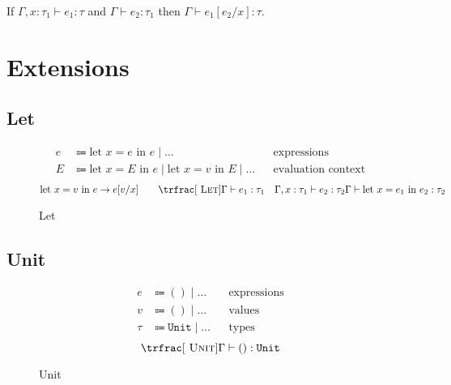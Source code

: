 \documentclass[nonacm]{acmart}
\newcommand{\unit}{\texttt{Unit}}
\begin{document}
\begin{lemma}
  If \(\Gamma, x : \tau_1 \vdash e_1 : \tau \) and \(\Gamma \vdash e_2 : \tau_1\)
  then \(\Gamma \vdash e_1[e_2/x] : \tau \).
\end{lemma}

\section{Extensions}

\subsection{Let}

\begin{figure}
  \begin{framed}
    \begin{align*}
      e & \Coloneqq \text{let } x = e \text{ in } e \mid \dots && \text{expressions} \\
      E & \Coloneqq \text{let } x = E \text{ in } e \mid \text{let } x = v \text{ in } E \mid \dots && \text{evaluation context}
    \end{align*}
    \[
      \text{let } x = v \text{ in } e \rightarrow e[v/x]
      \qquad
      \trfrac[~\textsc{Let}]{\Gamma \vdash e_1 : \tau_1 \quad \Gamma, x : \tau_1 \vdash e_2 : \tau_2}{\Gamma \vdash \text{let } x = e_1 \text{ in } e_2 : \tau_2}
    \]
  \end{framed}
  \caption{Let}\label{fig:let}
\end{figure}

\subsection{Unit}

\begin{figure}
  \begin{framed}
    \begin{align*}
      e & \Coloneqq () \mid \dots && \text{expressions} \\
      v & \Coloneqq () \mid \dots && \text{values} \\
      \tau & \Coloneqq \unit \mid \dots && \text{types}
    \end{align*}
    \[
      \trfrac[~\textsc{Unit}]{}{\Gamma \vdash () : \unit}
    \]
  \end{framed}
  \caption{Unit}\label{fig:unit}
\end{figure}
\end{document}
